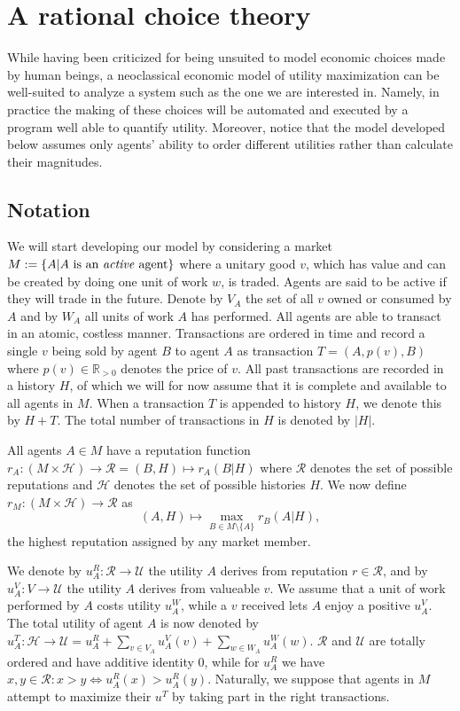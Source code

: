 \chapter{A rational choice theory}
While having been criticized for being unsuited to model economic choices made by human beings, a neoclassical economic model of utility maximization can be well-suited to analyze a system such as the one we are interested in. Namely, in practice the making of these choices will be automated and executed by a program well able to quantify utility. Moreover, notice that the model developed below assumes only agents' ability to order different utilities rather than calculate their magnitudes.

\section{Notation}\label{section:model_notation}
We will start developing our model by considering a market $M := \{ A | A \ \text{is an \emph{active} agent} \}$ where a unitary good $v$, which has value and can be created by doing one unit of work $w$, is traded. Agents are said to be active if they will trade in the future. Denote by $V_A$ the set of all $v$ owned or consumed by $A$ and by $W_A$ all units of work $A$ has performed. All agents are able to transact in an atomic, costless manner. Transactions are ordered in time and record a single $v$ being sold by agent $B$ to agent $A$ as transaction $T = (A, p(v), B)$ where $p(v) \in \mathds{R}_{>0}$ denotes the price of $v$. All past transactions are recorded in a history $H$, of which we will for now assume that it is complete and available to all agents in $M$. When a transaction $T$ is appended to history $H$, we denote this by $H + T$. The total number of transactions in $H$ is denoted by $|H|$.

All agents $A \in M$ have a reputation function $r_A: (M \times \mathcal{H}) \to \mathcal{R} = (B, H) \mapsto r_A(B | H)$ where $\mathcal{R}$ denotes the set of possible reputations and $\mathcal{H}$ denotes the set of possible histories $H$. We now define $r_M: (M \times \mathcal{H}) \to \mathcal{R}$ as
\[(A, H) \mapsto \max_{B \in M \setminus \{ A \}} r_B(A | H),\]
the highest reputation assigned by any market member.

We denote by $u^R_A: \mathcal{R} \to \mathcal{U}$ the utility $A$ derives from reputation $r \in \mathcal{R}$, and by $u^V_A: V \to \mathcal{U}$ the utility $A$ derives from valueable $v$. We assume that a unit of work performed by $A$ costs utility $u^W_A$, while a $v$ received lets $A$ enjoy a positive $u^V_A$. The total utility of agent $A$ is now denoted by $u^T_A: \mathcal{H} \to \mathcal{U} = u^R_A + \sum_{v \in V_A} u^V_A(v) + \sum_{w \in W_A} u^W_A(w)$. $\mathcal{R}$ and $\mathcal{U}$ are totally ordered and have additive identity $0$, while for $u^R_A$ we have $x, y \in \mathcal{R}: x > y \Leftrightarrow u^R_A(x) > u^R_A(y)$. Naturally, we suppose that agents in $M$ attempt to maximize their $u^T$ by taking part in the right transactions.

